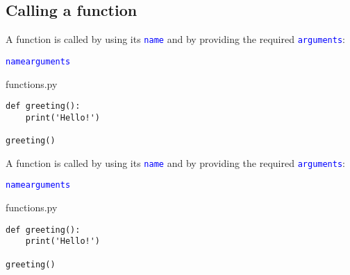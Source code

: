 \documentclass[aspectratio=1610,slidestop]{beamer}
\newcommand{\decl}[1]{\textcolor{blue}{\lstinline{#1}}}
\begin{document}
\subsection{Calling a function}
\begin{pframe}
 A function is called by using its \decl{name} and by providing the required
 \decl{arguments}:
 \begin{pythondeclaration}
  \decl{name}\emp{(}\decl{arguments}\emp{)}
 \end{pythondeclaration}
 \pause
 \begin{pythonfile}{functions.py}
  \begin{verbatim}
def greeting():
    print('Hello!')

greeting()
  \end{verbatim}
 \end{pythonfile}
\end{pframe}


\begin{pframe}
 A function is called by using its \decl{name} and by providing the required
 \decl{arguments}:
 \begin{pythondeclaration}
  \decl{name}\emp{(}\decl{arguments}\emp{)}
 \end{pythondeclaration}
 \vspace{0.1cm}
 \begin{minipage}[t]{0.47\textwidth}
  \begin{pythonfile}{functions.py}
   \begin{verbatim}
def greeting():
    print('Hello!')

greeting()
   \end{verbatim}
  \end{pythonfile}
 \end{minipage}\qquad
 \begin{minipage}[t]{0.47\textwidth}
 \vspace{-2.55cm}
 \begin{terminal}
 \end{terminal}
 \end{minipage}
\end{pframe}
\end{document}
